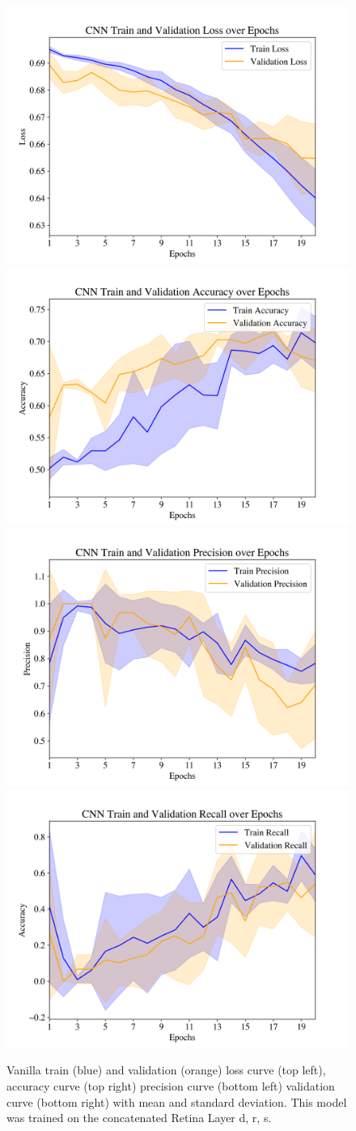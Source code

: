 \documentclass{article} %
\begin{document}
\begin{figure}[h]
\begin{center}
\includegraphics[width=.4\linewidth]{../3d/plots/cnn/loss.png}
\includegraphics[width=.4\linewidth]{../3d/plots/cnn/accuracy.png}
\includegraphics[width=.4\linewidth]{../3d/plots/cnn/precision.png}
\includegraphics[width=.4\linewidth]{../3d/plots/cnn/recall.png}
\end{center}
\caption{Vanilla train (blue) and validation (orange) loss curve (top left), accuracy curve (top right) precision curve (bottom left) validation curve (bottom right) with mean and standard deviation. This model was trained on the concatenated Retina Layer d, r, s.}
\end{figure}
\end{document}
